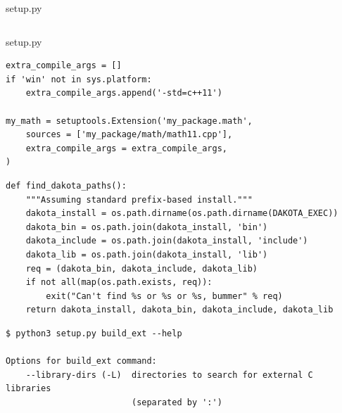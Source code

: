 \documentclass[pdf]{beamer}
\begin{document}
\begin{frame}[fragile]{setup.py}
\inputminted[highlightlines={4, 12}]{python}{my-package/setuptools-ext11.py}

\end{frame}

\begin{frame}[fragile]{setup.py}
    \begin{verbatim}
extra_compile_args = []
if 'win' not in sys.platform:
    extra_compile_args.append('-std=c++11')

my_math = setuptools.Extension('my_package.math',
    sources = ['my_package/math/math11.cpp'],
    extra_compile_args = extra_compile_args,
)
    \end{verbatim}
\end{frame}

\begin{frame}[fragile]
    \begin{verbatim}
def find_dakota_paths():
    """Assuming standard prefix-based install."""
    dakota_install = os.path.dirname(os.path.dirname(DAKOTA_EXEC))
    dakota_bin = os.path.join(dakota_install, 'bin')
    dakota_include = os.path.join(dakota_install, 'include')
    dakota_lib = os.path.join(dakota_install, 'lib')
    req = (dakota_bin, dakota_include, dakota_lib)
    if not all(map(os.path.exists, req)):
        exit("Can't find %s or %s or %s, bummer" % req)
    return dakota_install, dakota_bin, dakota_include, dakota_lib
    \end{verbatim}
\end{frame}

\begin{frame}[fragile]
    \begin{verbatim}
$ python3 setup.py build_ext --help

Options for build_ext command:
    --library-dirs (-L)  directories to search for external C libraries
                         (separated by ':')
    \end{verbatim}
\end{frame}
\end{document}
